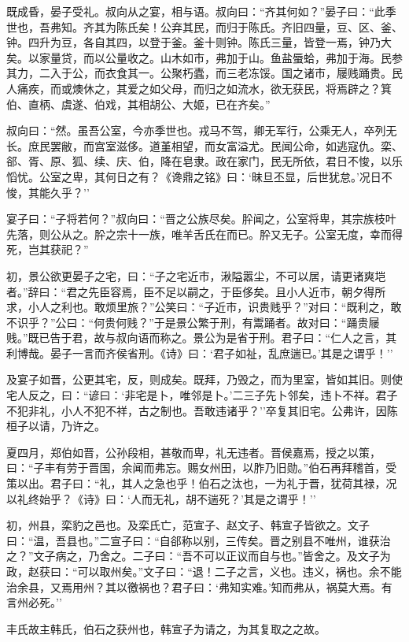 \documentclass[]{article}
\begin{document}
既成昏，晏子受礼。叔向从之宴，相与语。叔向曰：``齐其何如？''晏子曰：``此季世也，吾弗知。齐其为陈氏矣！公弃其民，而归于陈氏。齐旧四量，豆、区、釜、钟。四升为豆，各自其四，以登于釜。釜十则钟。陈氏三量，皆登一焉，钟乃大矣。以家量贷，而以公量收之。山木如市，弗加于山。鱼盐蜃蛤，弗加于海。民参其力，二入于公，而衣食其一。公聚朽蠹，而三老冻馁。国之诸市，屦贱踊贵。民人痛疾，而或燠休之，其爱之如父母，而归之如流水，欲无获民，将焉辟之？箕伯、直柄、虞遂、伯戏，其相胡公、大姬，已在齐矣。''

叔向曰：``然。虽吾公室，今亦季世也。戎马不驾，卿无军行，公乘无人，卒列无长。庶民罢敝，而宫室滋侈。道堇相望，而女富溢尤。民闻公命，如逃寇仇。栾、郤、胥、原、狐、续、庆、伯，降在皂隶。政在家门，民无所依，君日不悛，以乐慆忧。公室之卑，其何日之有？《谗鼎之铭》曰：`昧旦丕显，后世犹怠。'况日不悛，其能久乎？''

宴子曰：``子将若何？''叔向曰：``晋之公族尽矣。肸闻之，公室将卑，其宗族枝叶先落，则公从之。肸之宗十一族，唯羊舌氏在而已。肸又无子。公室无度，幸而得死，岂其获祀？''

初，景公欲更晏子之宅，曰：``子之宅近市，湫隘嚣尘，不可以居，请更诸爽垲者。''辞曰：``君之先臣容焉，臣不足以嗣之，于臣侈矣。且小人近市，朝夕得所求，小人之利也。敢烦里旅？''公笑曰：``子近市，识贵贱乎？''对曰：``既利之，敢不识乎？''公曰：``何贵何贱？''于是景公繁于刑，有鬻踊者。故对曰：``踊贵屦贱。''既已告于君，故与叔向语而称之。景公为是省于刑。君子曰：``仁人之言，其利博哉。晏子一言而齐侯省刑。《诗》曰：`君子如祉，乱庶遄已。'其是之谓乎！''

及宴子如晋，公更其宅，反，则成矣。既拜，乃毁之，而为里室，皆如其旧。则使宅人反之，曰：``谚曰：`非宅是卜，唯邻是卜。'二三子先卜邻矣，违卜不祥。君子不犯非礼，小人不犯不祥，古之制也。吾敢违诸乎？''卒复其旧宅。公弗许，因陈桓子以请，乃许之。

夏四月，郑伯如晋，公孙段相，甚敬而卑，礼无违者。晋侯嘉焉，授之以策，曰：``子丰有劳于晋国，余闻而弗忘。赐女州田，以胙乃旧勋。''伯石再拜稽首，受策以出。君子曰：``礼，其人之急也乎！伯石之汰也，一为礼于晋，犹荷其禄，况以礼终始乎？《诗》曰：`人而无礼，胡不遄死？'其是之谓乎！''

初，州县，栾豹之邑也。及栾氏亡，范宣子、赵文子、韩宣子皆欲之。文子曰：``温，吾县也。''二宣子曰：``自郤称以别，三传矣。晋之别县不唯州，谁获治之？''文子病之，乃舍之。二子曰：``吾不可以正议而自与也。''皆舍之。及文子为政，赵获曰：``可以取州矣。''文子曰：``退！二子之言，义也。违义，祸也。余不能治余县，又焉用州？其以徼祸也？君子曰：`弗知实难。'知而弗从，祸莫大焉。有言州必死。''

丰氏故主韩氏，伯石之获州也，韩宣子为请之，为其复取之之故。
\end{document}

